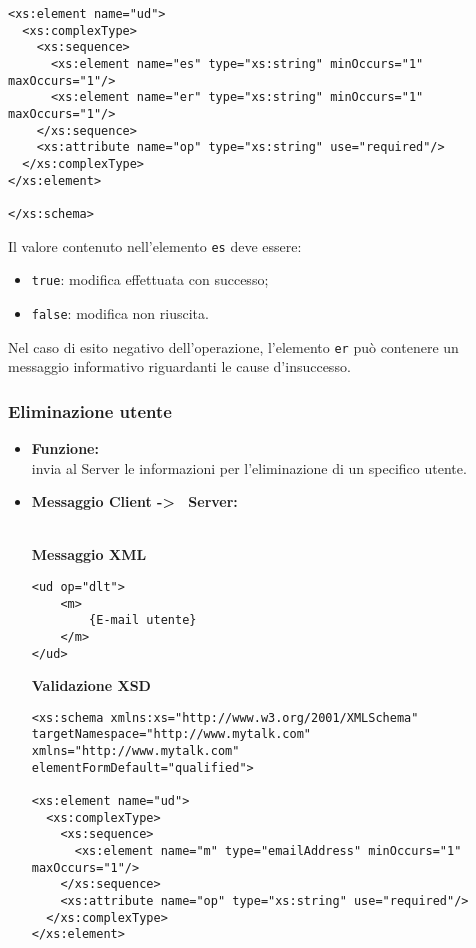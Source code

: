 {{\begin{itemize}
{\begin{lstlisting}
<xs:element name="ud">
  <xs:complexType>
    <xs:sequence>
      <xs:element name="es" type="xs:string" minOccurs="1" maxOccurs="1"/>
      <xs:element name="er" type="xs:string" minOccurs="1" maxOccurs="1"/>
    </xs:sequence>
    <xs:attribute name="op" type="xs:string" use="required"/>
  </xs:complexType>
</xs:element>

</xs:schema>
				\end{lstlisting}
				Il valore contenuto nell'elemento \texttt{es} deve essere:
				\begin{itemize}
					\item \texttt{true}: modifica effettuata con successo;
					\item \texttt{false}: modifica non riuscita.
				\end{itemize}
				Nel caso di esito negativo dell'operazione, l'elemento \texttt{er} può contenere un messaggio informativo riguardanti le cause d'insuccesso.
				}
		\end{itemize}
	}%
	
	\subsubsection{Eliminazione utente}{
	\label{opUDel}
		\begin{itemize}
			\item[] \textbf{Funzione:}{\\
				invia al Server le informazioni per l'eliminazione di un specifico utente.
				}
			
			\item[] \textbf{Messaggio Client -\textgreater~ Server:}{\\
			\textbf{Messaggio XML}\\
				\begin{lstlisting}
<ud op="dlt">
	<m>
		{E-mail utente}
	</m>
</ud>
				\end{lstlisting}
				\textbf{Validazione XSD}\\
				\begin{lstlisting}
<xs:schema xmlns:xs="http://www.w3.org/2001/XMLSchema"
targetNamespace="http://www.mytalk.com"
xmlns="http://www.mytalk.com"
elementFormDefault="qualified">

<xs:element name="ud">
  <xs:complexType>
    <xs:sequence>
      <xs:element name="m" type="emailAddress" minOccurs="1" maxOccurs="1"/>
    </xs:sequence>
    <xs:attribute name="op" type="xs:string" use="required"/>
  </xs:complexType>
</xs:element>


\end{lstlisting}}
\end{itemize}}}
